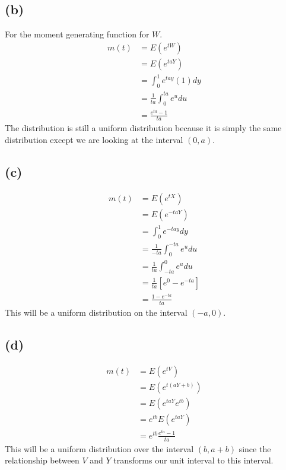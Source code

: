 \documentclass{article}
\theoremstyle{definition}
\begin{document}
    \subsection*{(b)}
        For the moment generating function for $W$.
        \begin{align*}
            m(t) &= E(e^{t W}) \\
            &= E(e^{t a Y})\\
            &= \int_0^1 e^{t a y} (1) dy \\
            &= \frac{1}{t a} \int_0^{t a} e^u du\\
            &= \frac{e^{ta} - 1}{ta}
        \end{align*}
        The distribution is still a uniform distribution because it is simply the same distribution except
        we are looking at the interval $(0, a)$.

    \subsection*{(c)}
        \begin{align*}
            m(t) &= E(e^{t X})\\
            &= E(e^{-t a Y})\\
            &= \int_0^1 e^{-t a y} dy\\
            &= \frac{1}{-ta} \int_0^{-ta} e^u du\\
            &= \frac{1}{ta} \int_{-ta}^0 e^u du\\
            &= \frac{1}{ta} [e^0 - e^{-ta}]\\
            &= \frac{1 - e^{-ta}}{ta}
        \end{align*}
        This will be a uniform distribution on the interval $(-a, 0)$.

    \subsection*{(d)}
        \begin{align*}
            m(t) &= E(e^{t V})\\
            &= E(e^{t(aY + b)})\\
            &= E(e^{t a Y}e^{t b})\\
            &= e^{t b} E(e^{t a Y})\\
            &= e^{t b} \frac{e^{ta} - 1}{ta}
        \end{align*}
        This will be a uniform distribution over the interval $(b, a+b)$ since the relationship between 
        $V$ and $Y$ transforms our unit interval to this interval.
\end{document}
